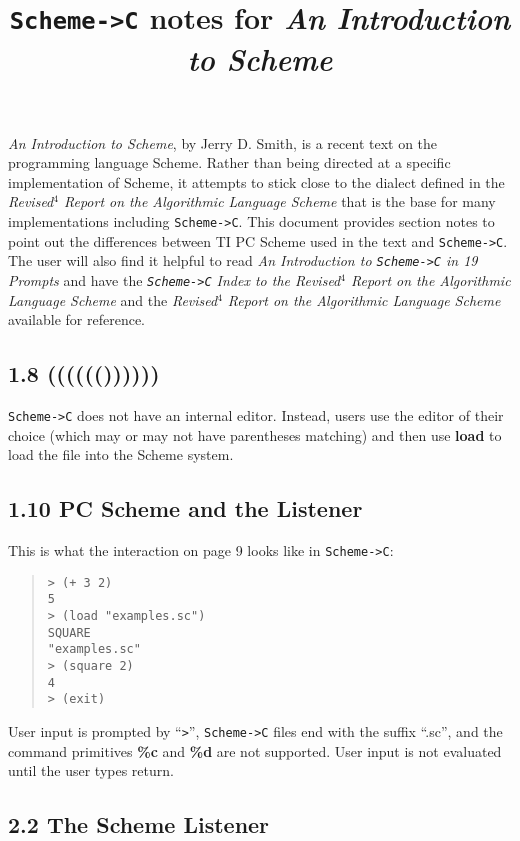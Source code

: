 \documentclass[10pt]{article}
\title{\texttt{Scheme->C} notes for \emph{An Introduction to Scheme}}
\date{}
\begin{document}
\maketitle

\emph{An Introduction to Scheme}, by Jerry D. Smith, is a recent
text on the programming language Scheme.  Rather than being
directed at a specific implementation of Scheme, it attempts
to stick close to the dialect defined in the \emph{Revised$^4$
Report on the Algorithmic Language Scheme} that is the base
for many implementations including \texttt{Scheme->C}.  This document
provides section notes to point out the differences between TI
PC Scheme used in the text and \texttt{Scheme->C}.  The user will also
find it helpful to read \emph{An Introduction to \texttt{Scheme->C} in 19
Prompts} and have the \emph{\texttt{Scheme->C} Index to the Revised$^4$
Report on the Algorithmic Language Scheme} and the
\emph{Revised$^4$ Report on the Algorithmic Language Scheme}
available for reference.

\subsection*{1.8 (((((())))))}

\texttt{Scheme->C} does not have an internal editor.  Instead, users
use the editor of their choice (which may or may not have
parentheses matching) and then use \textbf{load} to load the file
into the Scheme system.

\subsection*{1.10 PC Scheme and the Listener}

This is what the interaction on page 9 looks like in \texttt{Scheme->C}:

\begin{quote}
\begin{verbatim}
> (+ 3 2)
5
> (load "examples.sc")
SQUARE
"examples.sc"
> (square 2)
4
> (exit)
\end{verbatim}
\end{quote}

User input is prompted by ``\texttt{>}'', \texttt{Scheme->C} files end with the
suffix ``.sc'', and the command primitives \textbf{\%c} and \textbf{\%d} are
not supported.  User input is not evaluated until the user
types return.

\subsection*{2.2 The Scheme Listener}
\end{document}

